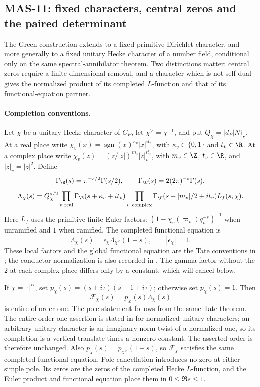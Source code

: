 \subsection{MAS-11: fixed characters, central zeros and the paired determinant}
The Green construction extends to a fixed primitive Dirichlet character, and more generally to a fixed unitary Hecke character of a number field, conditional only on the same spectral-annihilator theorem. Two distinctions matter: central zeros require a finite-dimensional removal, and a character which is not self-dual gives the normalized product of its completed $L$-function and that of its functional-equation partner.

\paragraph{Completion conventions.}
Let $\chi$ be a unitary Hecke character of $C_F$, let $\chi^\vee=\chi^{-1}$, and put $Q_\chi=|d_F|N\mathfrak f_\chi$. At a real place write $\chi_v(x)=\operatorname{sgn}(x)^{\kappa_v}|x|^{it_v}$, with $\kappa_v\in\{0,1\}$ and $t_v\in\R$. At a complex place write $\chi_v(z)=(z/|z|)^{m_v}|z|_v^{it_v}$, with $m_v\in\Z$, $t_v\in\R$, and $|z|_v=|z|^2$. Define
\[
 \Gamma_{\R}(s)=\pi^{-s/2}\Gamma(s/2),\qquad
 \Gamma_{\C}(s)=2(2\pi)^{-s}\Gamma(s),
\]
\[
 \Lambda_\chi(s)=Q_\chi^{s/2}
 \prod_{v\text{ real}}\Gamma_{\R}(s+\kappa_v+it_v)
 \prod_{v\text{ complex}}\Gamma_{\C}(s+|m_v|/2+it_v)
 L_f(s,\chi).
\]
Here $L_f$ uses the primitive finite Euler factors: $(1-\chi_v(\varpi_v)q_v^{-s})^{-1}$ when unramified and $1$ when ramified. The completed functional equation is
\[
 \Lambda_\chi(s)=\epsilon_\chi\Lambda_{\chi^\vee}(1-s),
 \qquad |\epsilon_\chi|=1.
\]
These local factors and the global functional equation are the Tate conventions in \cite[\S4.7, pp.~19--22; Theorem 5.22, pp.~38--39]{poonen786}; the conductor normalization is also recorded in \cite[\S1, pp.~281--282]{rajan1998}. The gamma factor without the $2$ at each complex place differs only by a constant, which will cancel below.

If $\chi=|\cdot|^{i\tau}$, set $p_\chi(s)=(s+i\tau)(s-1+i\tau)$; otherwise set $p_\chi(s)=1$. Then
\[
 \mathcal F_\chi(s)=p_\chi(s)\Lambda_\chi(s)
\]
is entire of order one. The pole statement follows from the same Tate theorem. The entire-order-one assertion is stated in \cite[\S1, p.~282]{rajan1998} for normalized unitary characters; an arbitrary unitary character is an imaginary norm twist of a normalized one, so its completion is a vertical translate times a nonzero constant. The asserted order is therefore unchanged. Also $p_\chi(s)=p_{\chi^\vee}(1-s)$, so $\mathcal F_\chi$ satisfies the same completed functional equation. Pole cancellation introduces no zero at either simple pole. Its zeros are the zeros of the completed Hecke $L$-function, and the Euler product and functional equation place them in $0\le\Re s\le1$.

